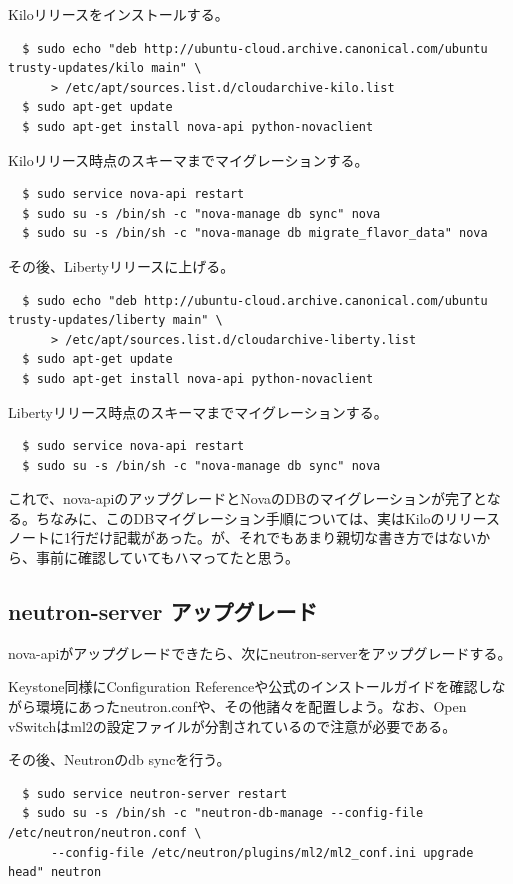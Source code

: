 \documentclass[9pt,b5paper,tombo,openany]{jsbook}
\begin{document}
\noindent
Kiloリリースをインストールする。

\begin{lstlisting}
  $ sudo echo "deb http://ubuntu-cloud.archive.canonical.com/ubuntu trusty-updates/kilo main" \
      > /etc/apt/sources.list.d/cloudarchive-kilo.list
  $ sudo apt-get update
  $ sudo apt-get install nova-api python-novaclient
\end{lstlisting}

\noindent
Kiloリリース時点のスキーマまでマイグレーションする。
\begin{lstlisting}
  $ sudo service nova-api restart
  $ sudo su -s /bin/sh -c "nova-manage db sync" nova
  $ sudo su -s /bin/sh -c "nova-manage db migrate_flavor_data" nova
\end{lstlisting}

\noindent
その後、Libertyリリースに上げる。
\begin{lstlisting}
  $ sudo echo "deb http://ubuntu-cloud.archive.canonical.com/ubuntu trusty-updates/liberty main" \
      > /etc/apt/sources.list.d/cloudarchive-liberty.list
  $ sudo apt-get update
  $ sudo apt-get install nova-api python-novaclient
\end{lstlisting}

\noindent
Libertyリリース時点のスキーマまでマイグレーションする。
\begin{lstlisting}
  $ sudo service nova-api restart
  $ sudo su -s /bin/sh -c "nova-manage db sync" nova
\end{lstlisting}

これで、nova-apiのアップグレードとNovaのDBのマイグレーションが完了となる。ちなみに、このDBマイグレーション手順については、実はKiloのリリースノートに1行だけ記載があった。が、それでもあまり親切な書き方ではないから、事前に確認していてもハマってたと思う。

\subsection{neutron-server アップグレード}

nova-apiがアップグレードできたら、次にneutron-serverをアップグレードする。

Keystone同様にConfiguration Referenceや公式のインストールガイドを確認しながら環境にあったneutron.confや、その他諸々を配置しよう。なお、Open vSwitchはml2の設定ファイルが分割されているので注意が必要である。

\noindent
その後、Neutronのdb syncを行う。
\begin{lstlisting}
  $ sudo service neutron-server restart
  $ sudo su -s /bin/sh -c "neutron-db-manage --config-file /etc/neutron/neutron.conf \
      --config-file /etc/neutron/plugins/ml2/ml2_conf.ini upgrade head" neutron
\end{lstlisting}
\end{document}
